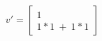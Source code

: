 \documentclass[preview]{standalone}
\begin{document}
\begin{align*}
v'=\begin{bmatrix}
                        1\\
                        1*1\ +\ 1*1
                        \end{bmatrix}\\
\end{align*}
\end{document}
